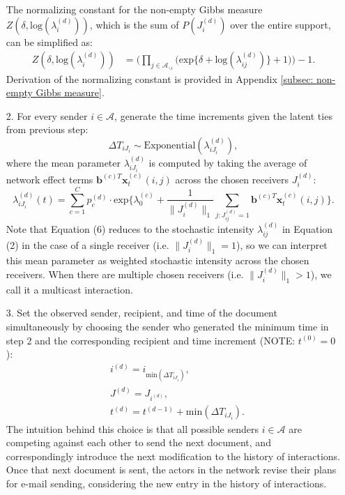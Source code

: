 \documentclass[a4paper]{article}
\begin{document}
\begin{itemize}
	The normalizing constant for the non-empty Gibbs measure $Z(\delta,\mbox{log}(\lambda_i^{(d)}))$, which is the sum of $P(J_i^{(d)})$ over the entire support, can be simplified as: 
	\begin{equation}
	\begin{aligned}
	Z(\delta,\mbox{log}(\lambda_i^{(d)})) &=\Big(\prod_{j \in \mathcal{A}_{\backslash i}} \Big(\mbox{exp}\{\delta+\mbox{log}(\lambda_{ij}^{(d)})\} + 1\Big)\Big)-1.
		\end{aligned}
	\end{equation}
	Derivation of the normalizing constant is provided in Appendix \ref{subsec: non-empty Gibbs measure}.
	\item[2.] For every sender $i \in \mathcal{A}$, generate the time increments given the latent ties from previous step: \begin{equation}
\Delta T_{i{J_i}} \sim \mbox{Exponential}(\lambda_{i{J_i}}^{(d)}),
	\end{equation}
	where the mean parameter $\lambda_{i{J_i}}^{(d)}$ is computed by taking the average of network effect terms $\boldsymbol{b}^{(c)T}\boldsymbol{x}^{(c)}_t(i, j)$ across the chosen receivers $J_i^{(d)}$:
	\begin{equation}
	\lambda^{(d)}_{iJ_i}(t)= \sum\limits_{c=1}^{C} p^{(d)}_c\cdot\mbox{exp}\Big\{\lambda^{(c)}_0+\frac{1}{\lVert J_i^{(d)} \rVert_1}\sum\limits_{j: J^{(d)}_{ij}=1} \boldsymbol{b}^{(c)T}\boldsymbol{x}^{(c)}_t(i, j)\Big\}.
	\end{equation}
	Note that Equation (6) reduces to the stochastic intensity $\lambda_{ij}^{(d)}$ in Equation (2) in the case of a single receiver (i.e. $\lVert J_i^{(d)}\rVert_1 = 1$), so we can interpret this mean parameter as weighted stochastic intensity across the chosen receivers. When there are multiple chosen receivers (i.e. $\lVert J_i^{(d)}\rVert_1 > 1$), we call it a multicast interaction.
	 	 \item[3.] Set the observed sender, recipient, and time of the document simultaneously by choosing the sender who generated the minimum time in step 2 and the corresponding recipient and time increment (NOTE: $t^{(0)}=0$):
	 	 \begin{equation}
	 	 \begin{aligned}
	 	  &i^{(d)} = i_{\mbox{min}(\Delta T_{i{J_i}})}, \\
	 	  &J^{(d)} = J_{i^{(d)}},\\
	 	  	 &t^{(d)} = t^{(d-1)}+\mbox{min}(\Delta T_{i{J_i}}).
	 	  \end{aligned}
	 	 \end{equation}
	 	 The intuition behind this choice is that all possible senders $i \in \mathcal{A}$ are competing against each other to send the next document, and correspondingly introduce the next modification to the history of interactions. Once that next document is sent, the actors in the network revise their plans for e-mail sending, considering the new entry in the history of interactions.
\end{itemize}
\end{document}
